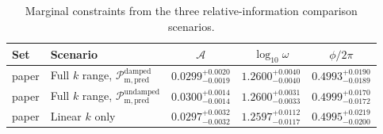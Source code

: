\begin{table}
\centering
\begin{tabular}{llccc}
\hline
Set & Scenario & $\mathcal{A}$ & $\log_{10}\omega$ & $\phi/2\pi$ \\
\hline
paper & Full $k$ range, $\mathcal{P}_{\mathrm{m,pred}}^{\mathrm{damped}}$ & $0.0299^{+0.0020}_{-0.0019}$ & $1.2600^{+0.0040}_{-0.0040}$ & $0.4993^{+0.0190}_{-0.0189}$ \\
paper & Full $k$ range, $\mathcal{P}_{\mathrm{m,pred}}^{\mathrm{undamped}}$ & $0.0300^{+0.0014}_{-0.0014}$ & $1.2600^{+0.0031}_{-0.0033}$ & $0.4999^{+0.0170}_{-0.0172}$ \\
paper & Linear $k$ only & $0.0297^{+0.0032}_{-0.0032}$ & $1.2597^{+0.0112}_{-0.0117}$ & $0.4995^{+0.0219}_{-0.0200}$ \\
\hline
\end{tabular}
\caption{Marginal constraints from the three relative-information comparison scenarios.}
\label{tab:wiggle_comparison_constraints}
\end{table}
